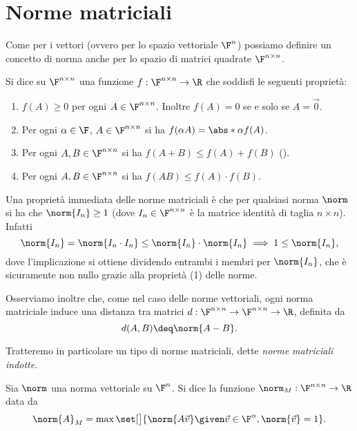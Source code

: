 \section{Norme matriciali}

Come per i vettori (ovvero per lo spazio vettoriale $\F^n$) possiamo definire un concetto di norma anche per lo spazio di matrici quadrate $\Mat{\F, n, n}$.

\begin{definition}
    Si dice  su $\Mat{\F, n, n}$ una funzione $f : \Mat{\F, n, n} \to \R$ che soddisfi le seguenti proprietà: 
    \begin{enumerate}[(1)]
        \item $f(A) \geq 0$ per ogni $A \in \Mat{\F, n, n}$. Inoltre $f(A) = 0$ se e solo se $A = \vec 0$.
        \item Per ogni $\alpha \in \F$, $A \in \Mat{\F, n, n}$ si ha $f(\alpha A) = \abs*{\alpha}f(A)$.
        \item Per ogni $A, B \in \Mat{\F, n, n}$ si ha $f(A + B) \leq f(A) + f(B)$ ().
        \item Per ogni $A, B \in \Mat{\F, n, n}$ si ha $f(AB) \leq f(A) \cdot f(B)$. 
    \end{enumerate} 
\end{definition}

Una proprietà immediata delle norme matriciali è che per qualsiasi norma $\norm$ si ha che $\norm{I_n} \geq 1$ (dove $I_n \in \Mat{\F, n, n}$ è la matrice identità di taglia $n \times n$). Infatti \[
    \norm{I_n} = \norm{I_n \cdot I_n} \leq \norm{I_n} \cdot \norm{I_n} \implies 1 \leq \norm{I_n},
\] dove l'implicazione si ottiene dividendo entrambi i membri per $\norm{I_n}$, che è sicuramente non nullo grazie alla proprietà (1) delle norme.

Osserviamo inoltre che, come nel caso delle norme vettoriali, ogni norma matriciale induce una distanza tra matrici $d : \Mat{\F, n, n} \to \Mat{\F, n, n} \to \R$, definita da \[
    d(A, B) \deq \norm{A - B}.
\]

Tratteremo in particolare un tipo di norme matriciali, dette \emph{norme matriciali indotte}.

\begin{definition}
    Sia $\norm$ una norma vettoriale su $\F^n$. Si dice  la funzione $\norm_M : \Mat{\F, n, n} \to \R$ data da \begin{align*}
        \norm{A}_M = \max \set[\big]{\norm{A\vec{v}} \given \vec v \in \F^n, \norm{\vec v}= 1}.
    \end{align*}
\end{definition}

